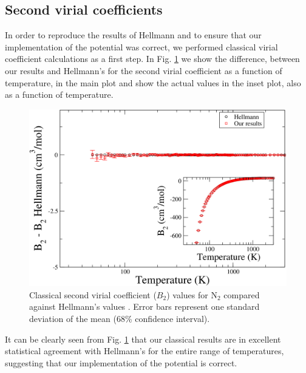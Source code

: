     \subsection{Second virial coefficients}
        In order to reproduce the results of Hellmann and to ensure that our implementation of the \abinitio{} potential was correct, we performed classical virial coefficient calculations as a first step. In Fig. \ref{fig:B2CLN2} we show the difference, between our results and Hellmann's for the second virial coefficient as a function of temperature, in the main plot and show the actual values in the inset plot, also as a function of temperature.
        \begin{figure}[!htbp]
            \centering
            \includegraphics[scale=0.20,keepaspectratio]{Chapter-5/Figures/B2CL9sResultsAll.png}
            \caption{Classical second virial coefficient ($B_2$) values for N$_2$ compared against Hellmann's values \cite{Hellmann2013}. Error bars represent one standard deviation of the mean (68\% confidence interval). }
            \label{fig:B2CLN2}
        \end{figure}
        It can be clearly seen from Fig. \ref{fig:B2CLN2} that our classical results are in excellent statistical agreement with Hellmann's for the entire range of temperatures, suggesting that our implementation of the \abinitio{} potential is correct.

